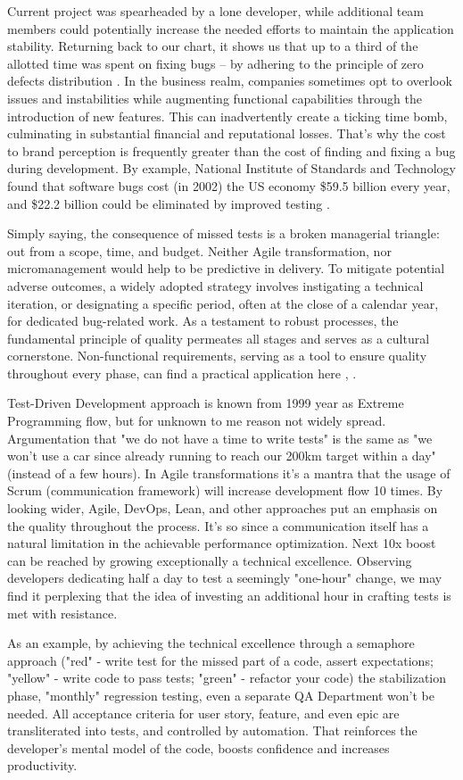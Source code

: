 Current project was spearheaded by a lone developer, while additional team members could potentially increase 
the needed efforts \cite{Alm21} to maintain the application stability. Returning back to our chart, it shows us 
that up to a third of the allotted time was spent on fixing bugs -- by adhering to the principle of zero 
defects distribution \cite{Allan98}. In the business realm, companies sometimes opt to overlook issues and instabilities 
while augmenting functional capabilities through the introduction of new features. This can inadvertently create a ticking 
time bomb, culminating in substantial financial and reputational losses. That's why the cost to brand perception is 
frequently greater than the cost of finding and fixing a bug during development. By example, National Institute of 
Standards and Technology found that software bugs cost (in 2002) the US economy \$59.5 billion every year, and 
\$22.2 billion could be eliminated by improved testing \cite{RTI02}.

Simply saying, the consequence of missed tests is a broken managerial triangle: out from a scope, time, and budget.
Neither Agile transformation, nor micromanagement would help to be predictive in delivery. To mitigate potential adverse 
outcomes, a widely adopted strategy involves instigating a technical iteration, or designating a specific period, often 
at the close of a calendar year, for dedicated bug-related work. As a testament to robust processes, the fundamental 
principle of quality permeates all stages and serves as a cultural cornerstone. Non-functional requirements, serving 
as a tool to ensure quality throughout every phase, can find a practical application here \cite{Sam17}, \cite{Suz12}. 

Test-Driven Development approach is known from 1999 year as Extreme Programming flow, but for unknown to me reason 
not widely spread. Argumentation that "we do not have a time to write tests" is the same as "we won't use a car since 
already running to reach our 200km target within a day" (instead of a few hours). In Agile transformations it's a mantra 
that the usage of Scrum (communication framework) will increase development flow 10 times. By looking wider, 
Agile, DevOps, Lean, and other approaches put an emphasis on the quality throughout the process. It's so since a 
communication itself has a natural limitation in the achievable performance optimization. Next 10x boost can be reached 
by growing exceptionally a technical excellence. Observing developers dedicating half a day to test a seemingly 
"one-hour" change, we may find it perplexing that the idea of investing an additional hour in crafting tests is met with 
resistance.

As an example, by achieving the technical excellence through a semaphore approach ("red" - write test for the missed 
part of a code, assert expectations; "yellow" - write code to pass tests; "green" - refactor your code) the 
stabilization phase, "monthly" regression testing, even a separate QA Department won't be needed. All acceptance 
criteria for user story, feature, and even epic are transliterated into tests, and controlled by automation. That 
reinforces the developer's mental model of the code, boosts confidence and increases productivity.
